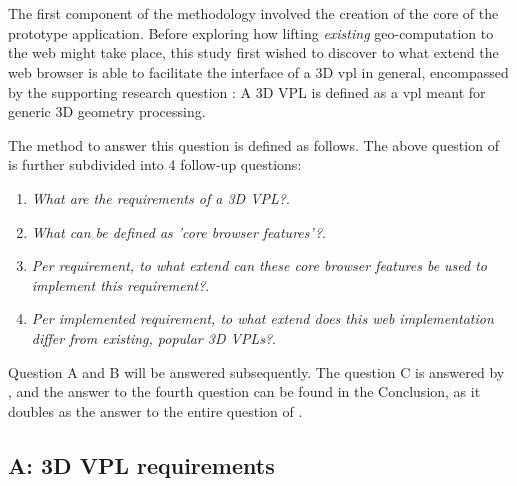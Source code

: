 
\section{\mySubRQOneTitle} 
\label{sec:method-one}

The first component of the methodology involved the creation of the core of the prototype application. 
Before exploring how lifting \emph{existing} geo-computation to the web might take place, this study first wished to discover to what extend the web browser is able to facilitate the interface of a 3D vpl in general, encompassed by the supporting research question : \mySubRQOne
A 3D VPL is defined as a vpl meant for generic 3D geometry processing.

The method to answer this question is defined as follows. 
The above question of \mySubRQOneTitle is further subdivided into 4 follow-up questions:
\begin{enumerate}[A]
  \item \emph{What are the requirements of a 3D VPL?}.
  \item \emph{What can be defined as 'core browser features'?}.
  \item \emph{Per requirement, to what extend can these core browser features be used to implement this requirement?}.
  \item \emph{Per implemented requirement, to what extend does this web implementation differ from existing, popular 3D VPLs?}.
\end{enumerate}

Question A and B will be answered subsequently. 
The question C is answered by , and the answer to the fourth question can be found in the Conclusion, as it doubles as the answer to the entire question of \mySubRQOneTitle.

\subsection*{A: 3D VPL requirements}

